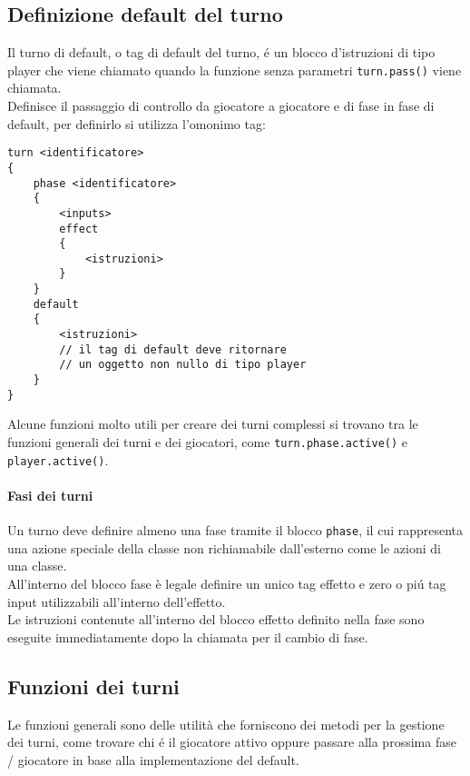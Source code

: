 \subsection{Definizione default del turno}
Il turno di default, o tag di default del turno, é un blocco d'istruzioni di tipo player
che viene chiamato quando la funzione senza parametri \lstinline|turn.pass()| viene chiamata. \\
Definisce il passaggio di controllo da giocatore a giocatore e di fase in fase di default,
per definirlo si utilizza l'omonimo tag:
\begin{lstlisting}
turn <identificatore>
{
    phase <identificatore>
    {
        <inputs>
        effect
        {
            <istruzioni>
        }
    }
    default
    {
        <istruzioni>
        // il tag di default deve ritornare 
        // un oggetto non nullo di tipo player
    }
}
\end{lstlisting}
Alcune funzioni molto utili per creare dei turni complessi si trovano tra le 
funzioni generali dei turni e dei giocatori, come \lstinline|turn.phase.active()| e
\lstinline|player.active()|.

\paragraph*{Fasi dei turni}
Un turno deve definire almeno una fase tramite il blocco \lstinline|phase|, il cui rappresenta 
una azione speciale della classe non richiamabile dall'esterno come le azioni di una classe. \\
All'interno del blocco fase è legale definire un unico tag effetto e zero o piú tag input utilizzabili 
all'interno dell'effetto. \\ 
Le istruzioni contenute all'interno del blocco effetto definito nella fase sono eseguite immediatamente
dopo la chiamata per il cambio di fase.

\subsection{Funzioni dei turni}
Le funzioni generali sono delle utilità che forniscono dei metodi per la gestione
dei turni, come trovare chi é il giocatore attivo oppure passare alla prossima 
fase / giocatore in base alla implementazione del default. \\

